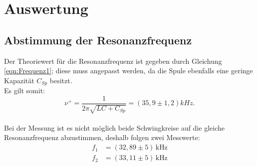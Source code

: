 \newpage
\section{Auswertung}
\label{sec:Auswertung}
\subsection{Abstimmung der Resonanzfrequenz}
Der Theoriewert für die Resonanzfrequenz ist gegeben durch Gleichung \eqref{eqn:Frequenz1};
diese muss angepasst werden, da die Spule ebenfalls eine geringe Kapazität $C_{Sp}$ besitzt.\\
Es gilt somit:\\
\begin{equation}
  \nu^{+}=\frac{1}{2\pi\sqrt{LC+C_{Sp}}}=(35,9\pm 1,2)kHz.
\end{equation}\\
Bei der Messung ist es nicht möglich beide Schwingkreise auf die gleiche Resonanzfrequenz abzustimmen, deshalb folgen zwei Messwerte:
\begin{align}
f_1&=(32,89\pm5)\,\si{\kilo\hertz}\\
f_2&=(33,11\pm5)\,\si{\kilo\hertz}
\end{align}
